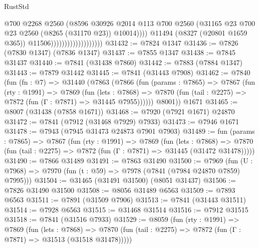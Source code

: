 \begin{lexlean}{RustStd}
\begin{coremodule}
                                              @700
                                              @2268
                                              @2560
                                              (@8596
                                                @30926
                                                @2014
                                                @113
                                                @700
                                                @2560
                                                (@31165
                                                  @23
                                                  @700
                                                  @23
                                                  @2560
                                                  (@8265 (@31170 @23))
                                                  @10014))))
                                          @11494
                                          (@8327 (@20801 @1659 @365))
                                          @11506)))))))))))))))))))
@31432 := @7824 @1347
@31436 := @7826 (@7830 @1347) (@7836 @1347)
@31437 := @7855 @1347
@31438 := @7845 @31437
@31440 := @7841 (@31438 @7860)
@31442 := @7883 (@7884 @1347)
@31443 := @7879 @31442
@31445 := @7841 (@31443 @7908)
@31462 := @7840
    (fun (fn : @7) =>
    @31440
      (@7863
        (@7866
          (fun (params : @7865) =>
          @7867
            (fun (rty : @1991) =>
            @7869
              (fun (lets : @7868) =>
              @7870 (fun (tail : @2275) => @7872 (fun (Γ : @7871) => @31445 @7955))))))
        @8001))
    @1671
@31465 := @8007 (@31438 (@7858 @1671))
@31468 := @7920 (@7921 @1671) @24870
@31472 := @7841 (@7912 (@31468 @7929) @7933)
@31473 := @7946 @1671
@31478 := @7943 (@7945 @31473 @24873 @7901 @7903)
@31489 := fun (params : @7865) =>
  @7867
    (fun (rty : @1991) =>
    @7869
      (fun (lets : @7868) =>
      @7870 (fun (tail : @2275) => @7872 (fun (Γ : @7871) => @31445 (@31472 @31478)))))
@31490 := @7866 @31489
@31491 := @7863 @31490
@31500 := @7969
    (fun (U : @7968) => @7970 (fun (t : @59) => @7978 (@7841 (@7984 @24870 @7859) @7995)))
@31504 := @31465 (@31491 @31500) (@8051 @31437)
@31506 := @7826 @31490 @31500
@31508 := @8056 @31489 @6563
@31509 := @7893 @6563
@31511 := @7891 (@31509 @7906)
@31513 := @7841 (@31443 @31511)
@31514 := @7928 @6563
@31515 := @31468 @31514
@31516 := @7912 @31515
@31518 := @7841 (@31516 @7933)
@31529 := @8059
    (fun (rty : @1991) =>
    @7869
      (fun (lets : @7868) =>
      @7870 (fun (tail : @2275) => @7872 (fun (Γ : @7871) => @31513 (@31518 @31478)))))

\end{coremodule}
\end{lexlean}
